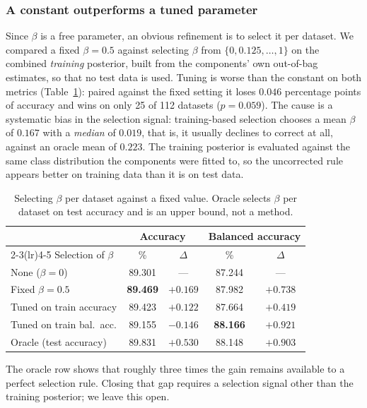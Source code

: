 \subsubsection{A constant outperforms a tuned parameter}

Since $\beta$ is a free parameter, an obvious refinement is to select it per dataset. We
compared a fixed $\beta = 0.5$ against selecting $\beta$ from
$\{0, 0.125, \dots, 1\}$ on the combined \emph{training} posterior, built from the
components' own out-of-bag estimates, so that no test data is used. Tuning is worse than
the constant on both metrics (Table~\ref{tab:tuning}): paired against the fixed setting
it loses $0.046$ percentage points of accuracy and wins on only 25 of 112 datasets
($p = 0.059$). The cause is a systematic bias in the selection signal: training-based
selection chooses a mean $\beta$ of $0.167$ with a \emph{median} of $0.019$, that is, it
usually declines to correct at all, against an oracle mean of $0.223$. The training
posterior is evaluated against the same class distribution the components were fitted to,
so the uncorrected rule appears better on training data than it is on test data.

\begin{table}[t]
\centering
\caption{Selecting $\beta$ per dataset against a fixed value. Oracle selects $\beta$
per dataset on test accuracy and is an upper bound, not a method.}
\label{tab:tuning}
\begin{tabular}{lcccc}
\toprule
& \multicolumn{2}{c}{Accuracy} & \multicolumn{2}{c}{Balanced accuracy} \\
\cmidrule(lr){2-3}\cmidrule(lr){4-5}
Selection of $\beta$ & \% & $\Delta$ & \% & $\Delta$ \\
\midrule
None ($\beta=0$)          & 89.301 & --- & 87.244 & --- \\
Fixed $\beta=0.5$         & \textbf{89.469} & $\mathbf{+0.169}$ & 87.982 & $+0.738$ \\
Tuned on train accuracy   & 89.423 & $+0.122$ & 87.664 & $+0.419$ \\
Tuned on train bal.\ acc. & 89.155 & $-0.146$ & \textbf{88.166} & $\mathbf{+0.921}$ \\
\midrule
Oracle (test accuracy)    & 89.831 & $+0.530$ & 88.148 & $+0.903$ \\
\bottomrule
\end{tabular}
\end{table}

The oracle row shows that roughly three times the gain remains available to a perfect
selection rule. Closing that gap requires a selection signal other than the training
posterior; we leave this open.


